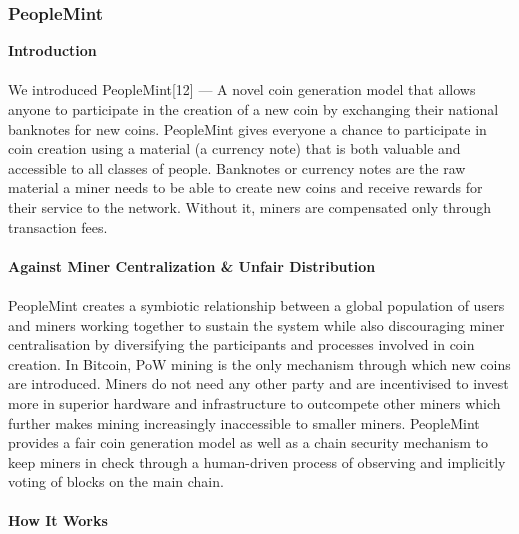 \newpage
\subsubsection{PeopleMint}
\vspace{5mm}
\textbf{Introduction} \\\\
We introduced PeopleMint[12] — A novel coin generation model that allows anyone to participate in the creation of a new coin by exchanging their national banknotes for new coins. PeopleMint gives everyone a chance to participate in coin creation using a material (a currency note) that is both valuable and accessible to all classes of people. Banknotes or currency notes are the raw material a miner needs to be able to create new coins and receive rewards for their service to the network. Without it, miners are compensated only through transaction fees.\\\\

\noindent
\textbf{Against Miner Centralization \& Unfair Distribution} \\\\
PeopleMint creates a symbiotic relationship between a global population of users and miners working together to sustain the system while also discouraging miner centralisation by diversifying the participants and processes involved in coin creation. In Bitcoin, PoW mining is the only mechanism through which new coins are introduced. Miners do not need any other party and are incentivised to invest more in superior hardware and infrastructure to outcompete other miners which further makes mining increasingly inaccessible to smaller miners. PeopleMint provides a fair coin generation model as well as a chain security mechanism to keep miners in check through a human-driven process of observing and implicitly voting of blocks on the main chain.\\\\


\noindent
\textbf{How It Works} \\

